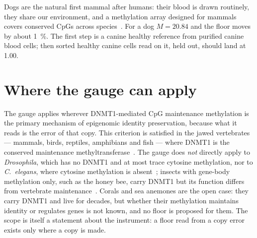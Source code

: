 Dogs are the natural first mammal after humans: their blood is drawn routinely, they share our environment, and a
methylation array designed for mammals covers conserved CpGs across species~\cite{Arneson2022}. For a dog $M=20.84$ and the
floor moves by about 1~\%. The first step is a canine healthy reference from purified canine blood cells; then sorted healthy
canine cells read on it, held out, should land at 1.00. \prediction

\section{Where the gauge can apply}

The gauge applies wherever DNMT1-mediated CpG maintenance methylation is the primary mechanism of epigenomic identity
preservation, because what it reads is the error of that copy. This criterion is satisfied in the jawed vertebrates ---
mammals, birds, reptiles, amphibians and fish --- where DNMT1 is the conserved maintenance methyltransferase~\cite{Lyko2018}.
\observed{} The gauge does \emph{not} directly apply to \emph{Drosophila}, which has no DNMT1 and at most trace cytosine
methylation, nor to \emph{C.~elegans}, where cytosine methylation is absent~\cite{Lyko2018}; insects with gene-body
methylation only, such as the honey bee, carry DNMT1 but its function differs from vertebrate maintenance~\cite{Lyko2010}.
\observed{} Corals and sea anemones are the open case: they carry DNMT1 and live for decades, but whether their methylation
maintains identity or regulates genes is not known, and no floor is proposed for them. \openprob{} The scope is itself a
statement about the instrument: a floor read from a copy error exists only where a copy is made. \interp
